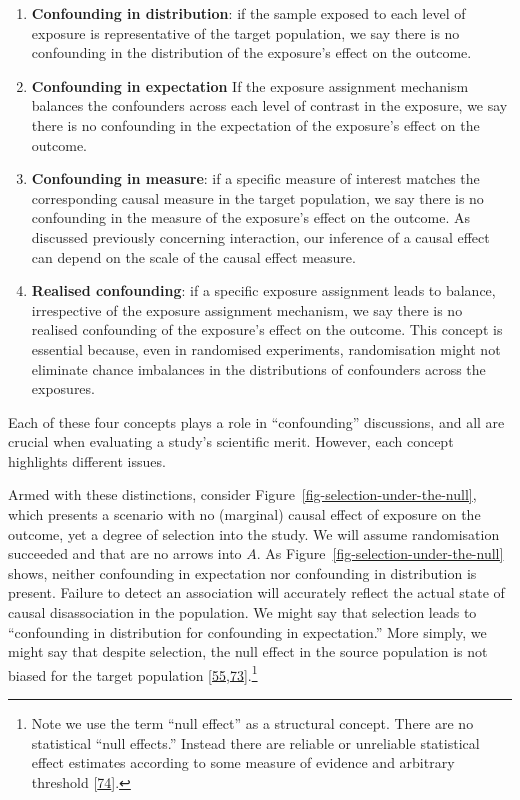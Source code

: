 \documentclass[
  singlecolumn]{article}
\begin{document}
\begin{enumerate}
\def\labelenumi{\arabic{enumi}.}
\item
  \textbf{Confounding in distribution}: if the sample exposed to each
  level of exposure is representative of the target population, we say
  there is no confounding in the distribution of the exposure's effect
  on the outcome.
\item
  \textbf{Confounding in expectation} If the exposure assignment
  mechanism balances the confounders across each level of contrast in
  the exposure, we say there is no confounding in the expectation of the
  exposure's effect on the outcome.
\item
  \textbf{Confounding in measure}: if a specific measure of interest
  matches the corresponding causal measure in the target population, we
  say there is no confounding in the measure of the exposure's effect on
  the outcome. As discussed previously concerning interaction, our
  inference of a causal effect can depend on the scale of the causal
  effect measure.
\item
  \textbf{Realised confounding}: if a specific exposure assignment leads
  to balance, irrespective of the exposure assignment mechanism, we say
  there is no realised confounding of the exposure's effect on the
  outcome. This concept is essential because, even in randomised
  experiments, randomisation might not eliminate chance imbalances in
  the distributions of confounders across the exposures.
\end{enumerate}

Each of these four concepts plays a role in ``confounding'' discussions,
and all are crucial when evaluating a study's scientific merit. However,
each concept highlights different issues.

Armed with these distinctions, consider
Figure~\ref{fig-selection-under-the-null}, which presents a scenario
with no (marginal) causal effect of exposure on the outcome, yet a
degree of selection into the study. We will assume randomisation
succeeded and that are no arrows into \(A\). As
Figure~\ref{fig-selection-under-the-null} shows, neither confounding in
expectation nor confounding in distribution is present. Failure to
detect an association will accurately reflect the actual state of causal
disassociation in the population. We might say that selection leads to
``confounding in distribution for confounding in expectation.'' More
simply, we might say that despite selection, the null effect in the
source population is not biased for the target population
{[}\protect\hyperlink{ref-hernuxe1n2004}{55},\protect\hyperlink{ref-greenland1977}{73}{]}.\footnote{Note
  we use the term ``null effect'' as a structural concept. There are no
  statistical ``null effects.'' Instead there are reliable or unreliable
  statistical effect estimates according to some measure of evidence and
  arbitrary threshold {[}\protect\hyperlink{ref-bulbulia2021}{74}{]}.}
\end{document}
